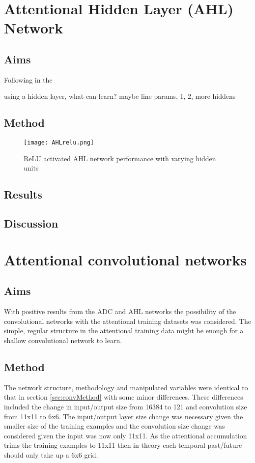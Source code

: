 \section{Attentional Hidden Layer (AHL) Network}

\subsection{Aims}
Following in the 

 using a hidden layer, what can learn? maybe line params, 1, 2, more hiddens

\subsection{Method}

\begin{figure}[h]
    \centering
    \texttt{[image: AHLrelu.png]}
    \caption{ReLU activated AHL network performance with varying hidden units}
    \label{fig:attnConvInvariant}
\end{figure}

\subsection{Results}


\subsection{Discussion}

\section{Attentional convolutional networks}
\subsection{Aims}
With positive results from the ADC and AHL networks the possibility of the convolutional networks with the attentional training datasets was considered. 
The simple, regular structure in the attentional training data might be enough for a shallow convolutional network to learn. 

\subsection{Method}
The network structure, methodology and manipulated variables were identical to that in section \ref{sec:convMethod} with some minor differences.
These differences included the change in input/output size from 16384 to 121 and convolution size from 11x11 to 6x6. 
The input/output layer size change was necessary given the smaller size of the training examples and the convolution size change was considered given the input was now only 11x11.
As the attentional accumulation trims the training examples to 11x11 then in theory each temporal past/future should only take up a 6x6 grid. 

